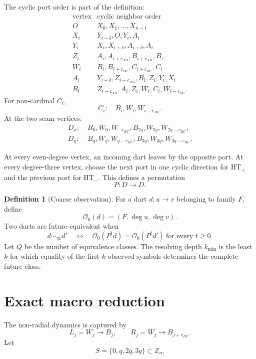 \documentclass[11pt,a4paper]{article}
\theoremstyle{definition}
\newtheorem{definition}[theorem]{Definition}
\newcommand{\ZZ}{\mathbb Z}
\newcommand{\Ozero}{\mathcal O_0}
\newcommand{\HTp}{\mathrm{HT}_{+}}
\newcommand{\HTm}{\mathrm{HT}_{-}}
\begin{document}
The cyclic port order is part of the definition:
\[
\begin{array}{c|l}
\text{vertex} & \text{cyclic neighbor order}\\
\hline
O & X_0,X_1,\ldots,X_{n-1}\\
X_i & Y_{i-\delta},O,Y_i,A_i\\
Y_i & X_i,X_{i+\delta},A_{i+\delta},A_i\\
Z_i & A_i,A_{i+c_{AB}},B_{i+c_{AB}},B_i\\
W_i & B_i,B_{i+c_{BC}},C_{i+c_{BC}},C_i\\
A_i & Y_{i-\delta},Z_{i-c_{AB}},B_i,Z_i,Y_i,X_i\\
B_i & Z_{i-c_{AB}},A_i,Z_i,W_i,C_i,W_{i-c_{BC}}.
\end{array}
\]
For non-cardinal \(C_i\),
\[
C_i:\quad B_i,W_i,W_{i-c_{BC}}.
\]
At the two seam vertices:
\begin{align*}
D_x:\;&B_0,W_0,W_{-c_{BC}},B_{2q},W_{2q},W_{2q-c_{BC}},\\
D_y:\;&B_q,W_q,W_{q-c_{BC}},B_{3q},W_{3q},W_{3q-c_{BC}}.
\end{align*}

At every even-degree vertex, an incoming dart leaves by the opposite port.
At every degree-three vertex, choose the next port in one cyclic direction for \(\HTp\) and the previous port for \(\HTm\).
This defines a permutation
\[
P:D\to D.
\]

\begin{definition}[Coarse observation]
For a dart \(d:u\to v\) belonging to family \(F\), define
\[
\Ozero(d)=(F,\deg u,\deg v).
\]
Two darts are future-equivalent when
\[
d\sim_\infty d'
\quad\Longleftrightarrow\quad
\Ozero(P^t d)=\Ozero(P^t d')
\ \text{for every }t\ge0.
\]
Let \(Q\) be the number of equivalence classes.
The resolving depth \(k_{\min}\) is the least \(k\) for which equality of the first \(k\) observed symbols determines the complete future class.
\end{definition}

\section{Exact macro reduction}\label{sec:macro}

The non-radial dynamics is captured by
\[
\boxed{L_j=W_j\to B_j},
\qquad
\boxed{R_j=W_j\to B_{j+c_{BC}}}.
\]
Let
\[
S=\{0,q,2q,3q\}\subset\ZZ_n.
\]
\end{document}
